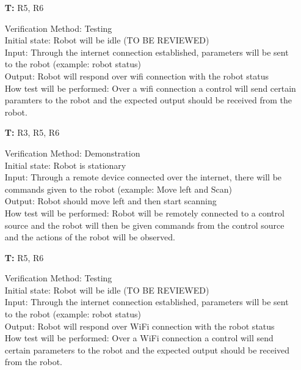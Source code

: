 \documentclass[12pt, titlepage]{article}
\newcounter{tnum} %
\begin{document}
\begin{itemize}
\item[\textbf{T\refstepcounter{tnum}\thetnum:}]{R5, R6\\}

Verification Method: Testing	\\
Initial state: Robot will be idle (TO BE REVIEWED) \\
Input: Through the internet connection established, parameters will be sent to the robot (example: robot status) \\
Output: Robot will respond over wifi connection with the robot status  \\
How test will be performed: Over a wifi connection a control will send certain paramters to the robot and the expected output should be received from the robot. \\

\item[\textbf{T\refstepcounter{tnum}\thetnum:}]{R3, R5, R6\\}

Verification Method: Demonstration\\
Initial state: Robot is stationary \\
Input: Through a remote device connected over the internet, there will be commands given to the robot (example: Move left and Scan) \\
Output: Robot should move left and then start scanning  \\
How test will be performed: Robot will be remotely connected to a control source and the robot will then be given commands from the control source and the actions of the robot will be observed. \\

\item[\textbf{T\refstepcounter{tnum}\thetnum:}]{R5, R6\\}

Verification Method: Testing\\
Initial state: Robot will be idle (TO BE REVIEWED) \\
Input: Through the internet connection established, parameters will be sent to the robot (example: robot status) \\
Output: Robot will respond over WiFi connection with the robot status  \\
How test will be performed: Over a WiFi connection a control will send certain parameters to the robot and the expected output should be received from the robot. \\


\end{itemize}
\end{document}
